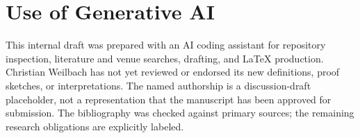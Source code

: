 \documentclass[acmsmall,screen,review,nonacm]{acmart}
\begin{document}
\section*{Use of Generative AI}
This internal draft was prepared with an AI coding assistant for repository
inspection, literature and venue searches, drafting, and LaTeX production.
Christian Weilbach has not yet reviewed or endorsed its new definitions,
proof sketches, or interpretations. The named authorship is a discussion-draft
placeholder, not a representation that the manuscript has been approved for
submission. The bibliography was checked against primary sources; the remaining
research obligations are explicitly labeled.



\end{document}
